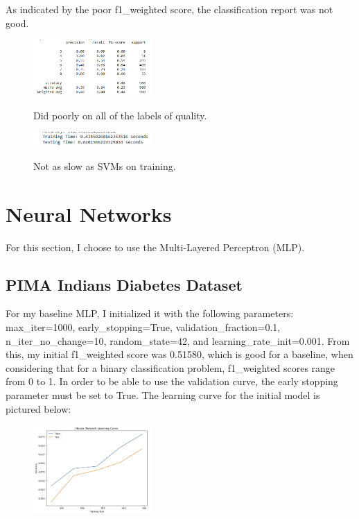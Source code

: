 \documentclass[conference]{IEEEtran}
\begin{document}
As indicated by the poor f1\_weighted score, the classification report was not good. 

\begin{figure}[H]
    \centering
    \includegraphics[width=0.40\textwidth]{Red Wine Quality Graph Images/Adaboost/ada cr.png}
    \label{fig:enter-label}
    \caption{Did poorly on all of the labels of quality.}
\end{figure}

\begin{figure}[H]
    \centering
    \includegraphics[width=0.40\textwidth]{Red Wine Quality Graph Images/Adaboost/ada wct.png}
    \label{fig:enter-label}
    \caption{Not as slow as SVMs on training.}
\end{figure}


\section{Neural Networks}
For this section, I choose to use the Multi-Layered Perceptron (MLP). 

\subsection{\textbf{PIMA Indians Diabetes Dataset}}\label{AA}
For my baseline MLP, I initialized it with the following parameters: {max\_iter=1000}, {early\_stopping=True}, {validation\_fraction=0.1}, {n\_iter\_no\_change=10},  {random\_state=42}, and {learning\_rate\_init=0.001}. From this, my initial f1\_weighted score was 0.51580, which is good for a baseline, when considering that for a binary classification problem, f1\_weighted scores range from 0 to 1. In order to be able to use the validation curve, the early stopping parameter must be set to True. The learning curve for the initial model is pictured below:

\begin{figure}[H]
    \centering
    \includegraphics[width=0.40\textwidth]{PIMA Indian Diabetes Graphs/Neural Nets/nn init lc.png}
    \label{fig:enter-label}
\end{figure}
\end{document}
